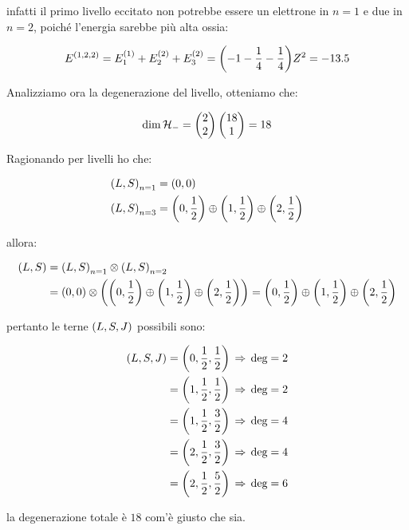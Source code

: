 \begin{itemize}
		infatti il primo livello eccitato non potrebbe essere un elettrone in $n = 1$ e due in $n= 2$, poiché l'energia sarebbe più alta ossia:
		
	\begin{align*}
		E^{\qty(1, 2, 2)} = E_1^{\qty(1)} + E_2^{\qty(2)} + E_3^{\qty(2)} = \qty(-1-\frac{1}{4}-\frac{1}{4}) Z^2 = -13.5
	\end{align*}
	
		Analizziamo ora la degenerazione del livello, otteniamo che:
 
 	\begin{align*}
		\text{dim} \, \mathcal{H}_- = \mqty(2 \\ 2) \, \mqty(18 \\ 1) = 18
	\end{align*}
	
		Ragionando per livelli ho che:
		
	\begin{align*}
		& \qty(L, S)_{n = 1} = \qty(0, 0) \\
		& \qty(L, S)_{n=3} = \qty(0, \frac{1}{2}) \oplus \qty(1, \frac{1}{2}) \oplus \qty(2, \frac{1}{2}) 
	\end{align*}

		allora:
		
	\begin{align*}
		\qty(L, S) & = \qty(L, S)_{n = 1} \otimes \qty(L, S)_{n = 2} \\
		& = \qty(0, 0) \otimes \qty( \qty(0, \frac{1}{2}) \oplus \qty(1, \frac{1}{2}) \oplus \qty(2, \frac{1}{2}) ) = \qty(0, \frac{1}{2}) \oplus \qty(1, \frac{1}{2}) \oplus \qty(2, \frac{1}{2}) 
	\end{align*}

		pertanto le terne $\qty(L, S, J)$ possibili sono:
		
	\begin{align*}
		\qty(L, S, J) & = \qty(0, \frac{1}{2}, \frac{1}{2}) \, \Rightarrow \,  \text{deg} = 2 \\
		& = \qty(1, \frac{1}{2}, \frac{1}{2}) \, \Rightarrow \,  \text{deg} = 2 \\
		& = \qty(1, \frac{1}{2}, \frac{3}{2}) \, \Rightarrow \,  \text{deg} = 4 \\
		& = \qty(2, \frac{1}{2}, \frac{3}{2}) \, \Rightarrow \,  \text{deg} = 4 \\
		& = \qty(2, \frac{1}{2}, \frac{5}{2}) \, \Rightarrow \,  \text{deg} = 6
	\end{align*}
	
		la degenerazione totale è $18$ com'è giusto che sia.
			
\end{itemize}

